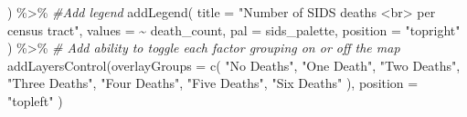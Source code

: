 \documentclass[
]{book}
\newenvironment{Shaded}{\begin{snugshade}}{\end{snugshade}}
\newcommand{\AttributeTok}[1]{\textcolor[rgb]{0.77,0.63,0.00}{#1}}
\newcommand{\CommentTok}[1]{\textcolor[rgb]{0.56,0.35,0.01}{\textit{#1}}}
\newcommand{\FunctionTok}[1]{\textcolor[rgb]{0.00,0.00,0.00}{#1}}
\newcommand{\NormalTok}[1]{#1}
\newcommand{\SpecialCharTok}[1]{\textcolor[rgb]{0.00,0.00,0.00}{#1}}
\newcommand{\StringTok}[1]{\textcolor[rgb]{0.31,0.60,0.02}{#1}}
\begin{document}
\begin{Shaded}
\begin{Highlighting}[]
\NormalTok{    ) }\SpecialCharTok{\%\textgreater{}\%}
    \CommentTok{\#Add legend}
    \FunctionTok{addLegend}\NormalTok{(}
        \AttributeTok{title =} \StringTok{"Number of SIDS deaths \textless{}br\textgreater{} per census tract"}\NormalTok{,}
        \AttributeTok{values =} \SpecialCharTok{\textasciitilde{}}\NormalTok{ death\_count,}
        \AttributeTok{pal =}\NormalTok{ sids\_palette,}
        \AttributeTok{position =} \StringTok{"topright"}
\NormalTok{    ) }\SpecialCharTok{\%\textgreater{}\%}
    \CommentTok{\# Add ability to toggle each factor grouping on or off the map}
    \FunctionTok{addLayersControl}\NormalTok{(}\AttributeTok{overlayGroups =} \FunctionTok{c}\NormalTok{(}
                \StringTok{"No Deaths"}\NormalTok{, }
                \StringTok{"One Death"}\NormalTok{, }
                \StringTok{"Two Deaths"}\NormalTok{, }
                \StringTok{"Three Deaths"}\NormalTok{, }
                \StringTok{"Four Deaths"}\NormalTok{, }
                \StringTok{"Five Deaths"}\NormalTok{, }
                \StringTok{"Six Deaths"}
\NormalTok{            ),}
            \AttributeTok{position =} \StringTok{"topleft"}
\NormalTok{        )}
\end{Highlighting}
\end{Shaded}


  
\end{document}
